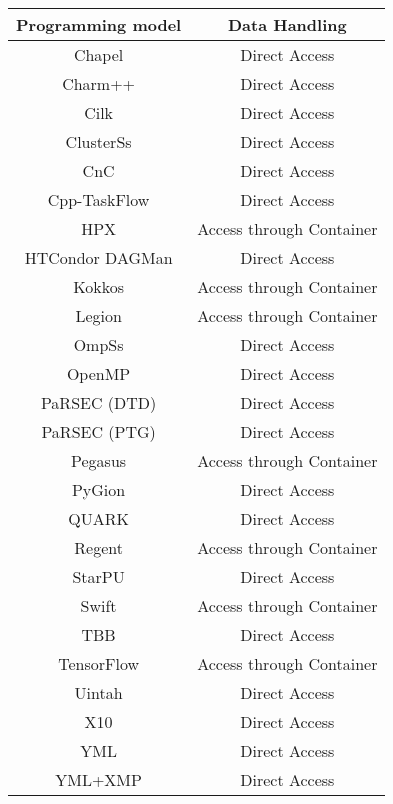 \begin{tabular}{cc}
\hline
Programming model & Data Handling \\
\hline
Chapel & Direct Access\\
Charm++ & Direct Access\\
Cilk & Direct Access\\
ClusterSs & Direct Access\\
CnC & Direct Access\\
Cpp-TaskFlow & Direct Access\\
HPX & Access through Container\\
HTCondor DAGMan & Direct Access\\
Kokkos & Access through Container\\
Legion & Access through Container\\
OmpSs & Direct Access\\
OpenMP & Direct Access\\
PaRSEC (DTD) & Direct Access\\
PaRSEC (PTG) & Direct Access\\
Pegasus & Access through Container\\
PyGion & Direct Access\\
QUARK & Direct Access\\
Regent & Access through Container\\
StarPU & Direct Access\\
Swift & Access through Container\\
TBB & Direct Access\\
TensorFlow & Access through Container\\
Uintah & Direct Access\\
X10 & Direct Access\\
YML & Direct Access\\
YML+XMP & Direct Access\\
\hline
\end{tabular}
